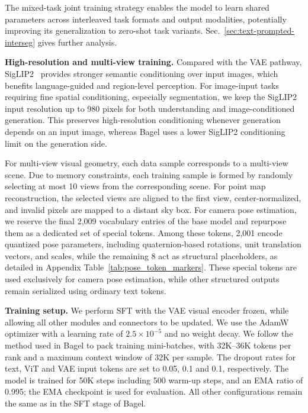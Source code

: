 The mixed-task joint training strategy enables the model to learn shared parameters across interleaved task formats and output modalities, potentially improving its generalization to zero-shot task variants.
Sec.~\ref{sec:text-prompted-interseg} gives further analysis.

\textbf{High-resolution and multi-view training.}
Compared with the VAE pathway, SigLIP2~\cite{siglip2} provides stronger semantic conditioning over input images, which benefits language-guided and region-level perception.
For image-input tasks requiring fine spatial conditioning, especially segmentation, we keep the SigLIP2 input resolution up to 980 pixels for both understanding and image-conditioned generation.
This preserves high-resolution conditioning whenever generation depends on an input image, whereas Bagel uses a lower SigLIP2 conditioning limit on the generation side.

For multi-view visual geometry, each data sample corresponds to a multi-view scene.
Due to memory constraints, each training sample is formed by randomly selecting at most 10 views from the corresponding scene.
For point map reconstruction, the selected views are aligned to the first view, center-normalized, and invalid pixels are mapped to a distant sky box.
For camera pose estimation, we reserve the final 2,009 vocabulary entries of the base model and repurpose them as a dedicated set of special tokens.
Among these tokens, 2,001 encode quantized pose parameters, including quaternion-based rotations, unit translation vectors, and scales, while the remaining 8 act as structural placeholders, as detailed in Appendix Table~\ref{tab:pose_token_markers}.
These special tokens are used exclusively for camera pose estimation, while other structured outputs remain serialized using ordinary text tokens.

\textbf{Training setup.}
We perform SFT with the VAE visual encoder frozen, while allowing all other modules and connectors to be updated.
We use the AdamW optimizer with a learning rate of $2.5\times10^{-5}$ and no weight decay.
We follow the method used in Bagel to pack training mini-batches, with 32K--36K tokens per rank and a maximum context window of 32K per sample.
The dropout rates for text, ViT and VAE input tokens are set to 0.05, 0.1 and 0.1, respectively.
The model is trained for 50K steps including 500 warm-up steps, and an EMA ratio of 0.995; the EMA checkpoint is used for evaluation.
All other configurations remain the same as in the SFT stage of Bagel.
